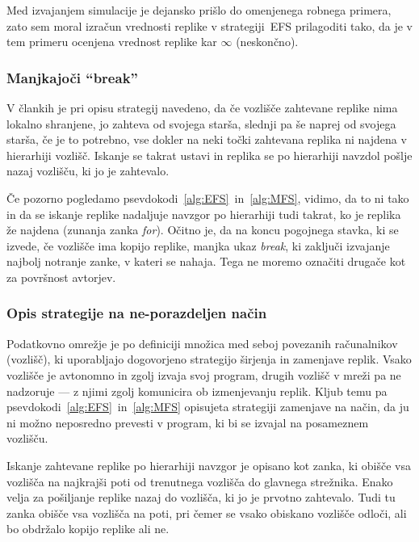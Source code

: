 \documentclass[a4paper, 12pt]{book}
\begin{document}
Med izvajanjem simulacije je dejansko prišlo do omenjenega robnega primera,
zato sem moral izračun vrednosti replike v strategiji~EFS prilagoditi tako,
da je v tem primeru ocenjena vrednost replike kar $\infty$ (neskončno).

\subsubsection{Manjkajoči ``break''}

V člankih je pri opisu strategij navedeno, da če vozlišče zahtevane replike
nima lokalno shranjene, jo zahteva od svojega starša, slednji pa še naprej
od svojega starša, če je to potrebno, vse dokler na neki točki zahtevana
replika ni najdena v hierarhiji vozlišč. Iskanje se takrat ustavi in replika
se po hierarhiji navzdol pošlje nazaj vozlišču, ki jo je zahtevalo.

Če pozorno pogledamo psevdokodi~\ref{alg:EFS}~in~\ref{alg:MFS}, vidimo, da to
ni tako in da se iskanje replike nadaljuje navzgor po hierarhiji tudi takrat,
ko je replika že najdena (zunanja zanka \textit{for}). Očitno je, da na koncu
pogojnega stavka, ki se izvede, če vozlišče ima kopijo replike, manjka ukaz
\textit{break}, ki zaključi izvajanje najbolj notranje zanke, v kateri se
nahaja. Tega ne moremo označiti drugače kot za površnost avtorjev.

\subsubsection{Opis strategije na ne-porazdeljen način}

Podatkovno omrežje je po definiciji množica med seboj povezanih računal\-nikov
(vozlišč), ki uporabljajo dogovorjeno strategijo širjenja in zamenjave replik.
Vsako vozlišče je avtonomno in zgolj izvaja svoj program, drugih vozlišč v
mreži pa ne nadzoruje --- z njimi zgolj komunicira ob izmenjevanju
replik. Kljub temu pa psevdokodi~\ref{alg:EFS}~in~\ref{alg:MFS}
opisujeta strategiji zamenjave na način, da ju ni možno neposredno prevesti v
program, ki bi se izvajal na posameznem vozlišču.

Iskanje zahtevane replike po hierarhiji navzgor je opisano kot zanka, ki obišče
vsa vozlišča na najkrajši poti od trenutnega vozlišča do glavnega strežnika.
Enako velja za pošiljanje replike nazaj do vozlišča, ki jo je prvotno
zahtevalo.
Tudi tu zanka obišče vsa vozlišča na poti, pri čemer se vsako obiskano vozlišče
odloči, ali bo obdržalo kopijo replike ali ne.
\end{document}
